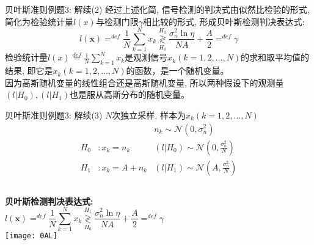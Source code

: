 \begin{frame}[shrink]{贝叶斯准则例题3: 解续(2)}
经过上述化简, 信号检测的判决式由似然比检验的形式, 简化为检验统计量$l(x)$与检测门限$\gamma$相比较的形式, 形成贝叶斯检测判决表达式:
\[
l(\bm{x})\mathop{=}^{def}\frac{1}{N}\sum\limits_{k=1}^{N}x_k\mathop{\gtrless}\limits_{H_0}^{H_1}\frac{\sigma_n^2\ln\eta}{NA}+\frac{A}{2}\mathop{=}^{def}\gamma
\]
检验统计量$l(x)\mathop{=}\limits^{def}\frac{1}{N}\sum\limits_{k=1}^Nx_k$是观测信号$x_k(k=1,2,\dots,N)$的求和取平均值的结果, 即它是$x_k(k=1,2,\dots,N)$的函数，是一个随机变量。\\
因为高斯随机变量的线性组合还是高斯随机变量,  所以两种假设下的观测量$(l|H_0),(l|H_1)$也是服从高斯分布的随机变量。
\end{frame}

\begin{frame}[shrink]{贝叶斯准则例题3: 解续(3)}
$N$次独立采样, 样本为$x_k(k=1,2,\dots,N)$
\begin{align*}
&&n_k\sim\mathcal{N}(0,\sigma_n^2)\\ 
H_0 &:x_k=n_k   &(l|H_0)\sim\mathcal{N}(0,\frac{\sigma_n^2}{N})\\
H_1 &:x_k=A+n_k &(l|H_1)\sim\mathcal{N}(A,\frac{\sigma_n^2}{N})
\end{align*}
\begin{columns}
\textbf{贝叶斯检测判决表达式:}\\
\[
l(\bm{x})\mathop{=}^{def}\frac{1}{N}\sum\limits_{k=1}^{N}x_k\mathop{\gtrless}\limits_{H_0}^{H_1}\frac{\sigma_n^2\ln\eta}{NA}+\frac{A}{2}\mathop{=}^{def}\gamma
\]
\texttt{[image: 0AL]}
\end{columns}
\end{frame}

